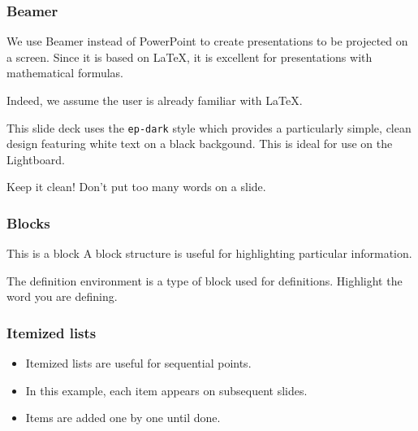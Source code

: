 \documentclass[t,14pt]{beamer}
\begin{document}
%

\titleframe


\begin{frame}
  \frametitle{Beamer}
  \large 

  We use \alert{Beamer} instead of PowerPoint to create presentations
  to be projected on a screen. Since it is based on \LaTeX, it is
  excellent for presentations with mathematical formulas.

  Indeed, we assume the user is already familiar with \LaTeX.
\end{frame}

\begin{frame}
  \large

  This slide deck uses the \texttt{ep-dark} style which provides a
  particularly simple, clean design featuring white text on a black
  backgound. This is ideal for use on the Lightboard.

  Keep it clean! Don't put too many words on a slide.
\end{frame}


\begin{frame}
  \frametitle{Blocks}
  \large
  \begin{block}{This is a block}
    A \alert{block} structure is useful for highlighting particular
    information.
  \end{block}

  \begin{definition}
    The \alert{definition} environment is a type of block used for
    definitions. Highlight the word you are defining.
  \end{definition}
\end{frame}

\begin{frame}
  \frametitle{Itemized lists}
  \large
  \begin{itemize}
  \item<+-> Itemized lists are useful for sequential points.
  \item<+-> In this example, each item appears on subsequent slides.
  \item<+-> Items are added one by one until done. 
  \end{itemize}
\end{frame}
\end{document}
